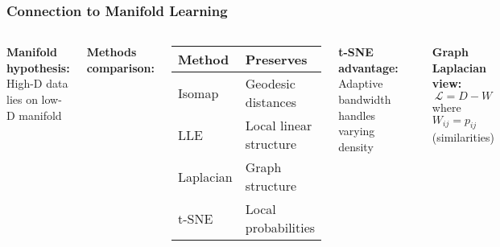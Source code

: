 \documentclass[aspectratio=169]{beamer}
\begin{document}
\begin{frame}
\frametitle{Connection to Manifold Learning}
\begin{columns}[T]
\textbf{Manifold hypothesis:}\\
\small High-D data lies on low-D manifold

\vspace{0.3cm}
\textbf{Methods comparison:}
\begin{center}
\tiny
\begin{tabular}{|l|l|}
\hline
Method & Preserves \\
\hline
Isomap & Geodesic distances \\
LLE & Local linear structure \\
Laplacian & Graph structure \\
t-SNE & Local probabilities \\
\hline
\end{tabular}
\end{center}

\vspace{0.3cm}
\textbf{t-SNE advantage:}\\
\small Adaptive bandwidth handles varying density

\begin{center}
\end{center}

\textbf{Graph Laplacian view:}
$$\mathcal{L} = D - W$$
where $W_{ij} = p_{ij}$ (similarities)
\end{columns}
\end{frame}
\end{document}
